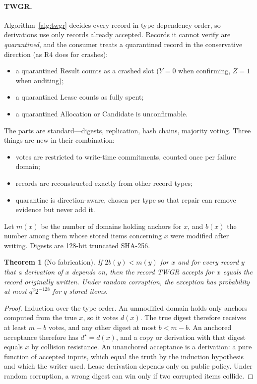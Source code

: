 \documentclass[11pt]{article}
\newtheorem{theorem}{Theorem}
\theoremstyle{definition}
\begin{document}
\paragraph{TWGR.} Algorithm~\ref{alg:twgr} decides every record in type-dependency order, so derivations use only records already accepted. Records it cannot verify are \emph{quarantined}, and the consumer treats a quarantined record in the conservative direction (as R4 does for crashes):
\begin{itemize}
\item a quarantined Result counts as a crashed slot ($Y=0$ when confirming, $Z=1$ when auditing);
\item a quarantined Lease counts as fully spent;
\item a quarantined Allocation or Candidate is unconfirmable.
\end{itemize}
The parts are standard---digests, replication, hash chains, majority voting. Three things are new in their combination:
\begin{itemize}
\item votes are restricted to write-time commitments, counted once per failure domain;
\item records are reconstructed exactly from other record types;
\item quarantine is direction-aware, chosen per type so that repair can remove evidence but never add it.
\end{itemize}

Let $m(x)$ be the number of domains holding anchors for $x$, and $b(x)$ the number among them whose stored items concerning $x$ were modified after writing. Digests are 128-bit truncated SHA-256.

\begin{theorem}[No fabrication]\label{thm:nofab}
If $2b(y)<m(y)$ for $x$ and for every record $y$ that a derivation of $x$ depends on, then the record TWGR accepts for $x$ equals the record originally written. Under random corruption, the exception has probability at most $q^2 2^{-128}$ for $q$ stored items.
\end{theorem}
\begin{proof}
Induction over the type order. An unmodified domain holds only anchors computed from the true $x$, so it votes $d(x)$. The true digest therefore receives at least $m-b$ votes, and any other digest at most $b<m-b$. An anchored acceptance therefore has $d^\star=d(x)$, and a copy or derivation with that digest equals $x$ by collision resistance. An unanchored acceptance is a derivation: a pure function of accepted inputs, which equal the truth by the induction hypothesis and which the writer used. Lease derivation depends only on public policy. Under random corruption, a wrong digest can win only if two corrupted items collide.
\end{proof}
\end{document}
